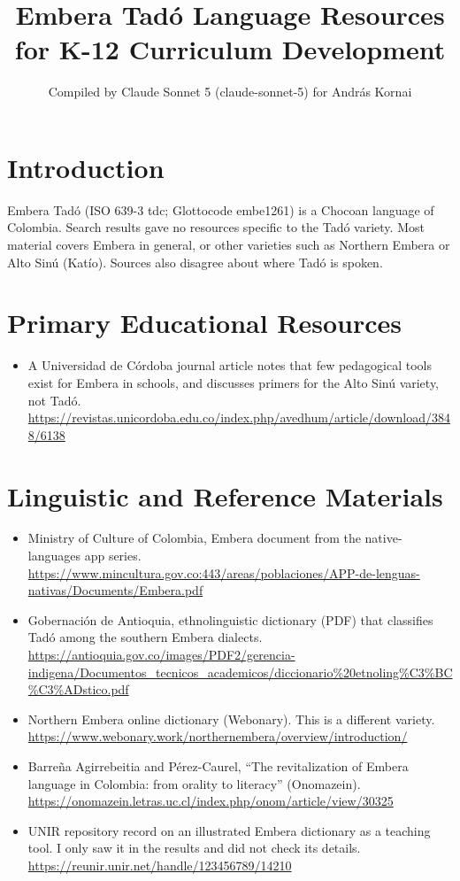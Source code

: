 \documentclass[12pt]{article}
\title{Embera Tad\'o Language Resources for K-12 Curriculum Development}
\author{Compiled by Claude Sonnet 5 (claude-sonnet-5) for Andr\'as Kornai}
\date{}
\begin{document}
\maketitle

\section{Introduction}
Embera Tad\'o (ISO 639-3 tdc; Glottocode embe1261) is a Chocoan language of Colombia. Search results gave no resources specific to the Tad\'o variety. Most material covers Embera in general, or other varieties such as Northern Embera or Alto Sin\'u (Kat\'io). Sources also disagree about where Tad\'o is spoken.

\section{Primary Educational Resources}
\begin{itemize}
\item A Universidad de C\'ordoba journal article notes that few pedagogical tools exist for Embera in schools, and discusses primers for the Alto Sin\'u variety, not Tad\'o. \url{https://revistas.unicordoba.edu.co/index.php/avedhum/article/download/3848/6138}
\end{itemize}

\section{Linguistic and Reference Materials}
\begin{itemize}
\item Ministry of Culture of Colombia, Embera document from the native-languages app series. \url{https://www.mincultura.gov.co:443/areas/poblaciones/APP-de-lenguas-nativas/Documents/Embera.pdf}
\item Gobernaci\'on de Antioquia, ethnolinguistic dictionary (PDF) that classifies Tad\'o among the southern Embera dialects. \url{https://antioquia.gov.co/images/PDF2/gerencia-indigena/Documentos_tecnicos_academicos/diccionario%20etnoling\%C3\%BC\%C3\%ADstico.pdf}
\item Northern Embera online dictionary (Webonary). This is a different variety. \url{https://www.webonary.work/northernembera/overview/introduction/}
\item Barre\~na Agirrebeitia and P\'erez-Caurel, ``The revitalization of Embera language in Colombia: from orality to literacy'' (Onomazein). \url{https://onomazein.letras.uc.cl/index.php/onom/article/view/30325}
\item UNIR repository record on an illustrated Embera dictionary as a teaching tool. I only saw it in the results and did not check its details. \url{https://reunir.unir.net/handle/123456789/14210}
\end{itemize}
\end{document}

